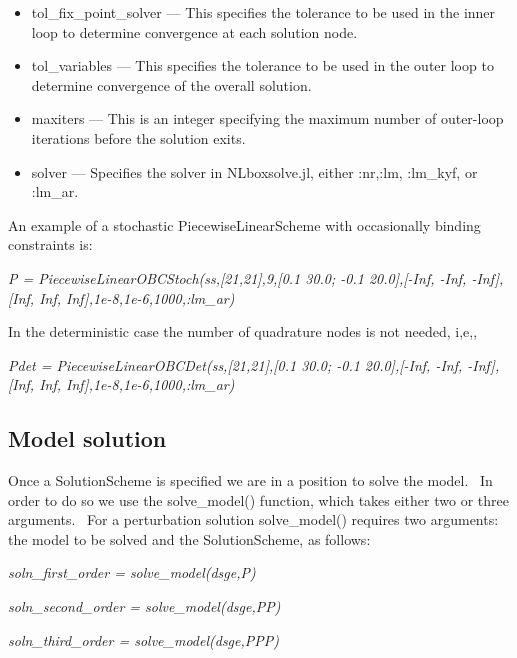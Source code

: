 \documentclass[notitlepage,11pt]{article}
\begin{document}
\begin{itemize}
\item tol\_fix\_point\_solver --- This specifies the tolerance to be used in
the inner loop to determine convergence at each solution node.

\item tol\_variables --- This specifies the tolerance to be used in the
outer loop to determine convergence of the overall solution.

\item maxiters --- This is an integer specifying the maximum number of
outer-loop iterations before the solution exits.

\item solver --- Specifies the solver in NLboxsolve.jl, either :nr,:lm,
:lm\_kyf, or :lm\_ar.
\end{itemize}

\bigskip

An example of a stochastic PiecewiseLinearScheme with occasionally binding
constraints is:

\bigskip

\textit{P = PiecewiseLinearOBCStoch(ss,[21,21],9,[0.1 30.0; -0.1
20.0],[-Inf, -Inf, -Inf],[Inf, Inf, Inf],1e-8,1e-6,1000,:lm\_ar)}

\bigskip

In the deterministic case the number of quadrature nodes is not needed, i,e,,

\bigskip

\textit{Pdet = PiecewiseLinearOBCDet(ss,[21,21],[0.1 30.0; -0.1 20.0],[-Inf,
-Inf, -Inf],[Inf, Inf, Inf],1e-8,1e-6,1000,:lm\_ar)}

\subsection{Model solution}

Once a SolutionScheme is specified we are in a position to solve the model.
\ In order to do so we use the solve\_model() function, which takes either
two or three arguments. \ For a perturbation solution solve\_model()
requires two arguments: the model to be solved and the SolutionScheme, as
follows:

\bigskip

\textit{soln\_first\_order = solve\_model(dsge,P)}

\bigskip

\textit{soln\_second\_order = solve\_model(dsge,PP)}

\bigskip

\textit{soln\_third\_order = solve\_model(dsge,PPP)}
\end{document}

